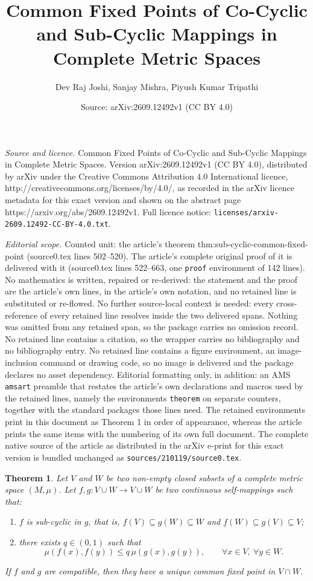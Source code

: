 \documentclass[10pt,a4paper]{amsart}
\title{Common Fixed Points of Co-Cyclic and Sub-Cyclic Mappings in Complete Metric Spaces}
\author{Dev Raj Joshi, Sanjay Mishra, Piyush Kumar Tripathi}
\date{Source: arXiv:2609.12492v1 (CC BY 4.0)}
\newtheorem{theorem}{Theorem}
\begin{document}
\maketitle

\noindent\emph{Source and licence.} Common Fixed Points of Co-Cyclic and Sub-Cyclic Mappings in Complete Metric Spaces. Version arXiv:2609.12492v1 (CC BY 4.0), distributed by arXiv under the Creative Commons Attribution 4.0 International licence, http://creativecommons.org/licenses/by/4.0/, as recorded in the arXiv licence metadata for this exact version and shown on the abstract page https://arxiv.org/abs/2609.12492v1. Full licence notice: \texttt{licenses/arxiv-2609.12492-CC-BY-4.0.txt}.\par\smallskip

\noindent\textit{Editorial scope.} Counted unit: the article's theorem thm:sub-cyclic-common-fixed-point (source0.tex lines 502--520). The article's complete original proof of it is delivered with it (source0.tex lines 522--663, one \texttt{proof} environment of 142 lines). No mathematics is written, repaired or re-derived: the statement and the proof are the article's own lines, in the article's own notation, and no retained line is substituted or re-flowed.  No further source-local context is needed: every cross-reference of every retained line resolves inside the two delivered spans.  Nothing was omitted from any retained span, so the package carries no omission record.  No retained line contains a citation, so the wrapper carries no bibliography and no bibliography entry.  No retained line contains a figure environment, an image-inclusion command or drawing code, so no image is delivered and the package declares no asset dependency.  Editorial formatting only, in addition: an AMS \texttt{amsart} preamble that restates the article's own declarations and macros used by the retained lines, namely the environments \texttt{theorem} on separate counters, together with the standard packages those lines need.  The retained environments print in this document as Theorem 1 in order of appearance, whereas the article prints the same items with the numbering of its own full document.  The complete native source of the article as distributed in the arXiv e-print for this exact version is bundled unchanged as \texttt{sources/210119/source0.tex}.
\begin{theorem}\label{thm:sub-cyclic-common-fixed-point}
Let $V$ and $W$ be two non-empty closed subsets of a complete metric
space $(M,\mu)$. Let $f,g:V\cup W\to V\cup W$ be two continuous self-mappings such that:

\begin{enumerate}
    \item[(i)] $f$ is sub-cyclic in $g$, that is, $ f(V)\subseteq g(W)\subseteq W$ and $ f(W)\subseteq g(V)\subseteq V$;
   

    \item[(ii)] there exists $q\in(0,1)$ such that
    \[
    \mu(f(x),f(y))
    \leq
    q\,\mu(g(x),g(y)),
    \qquad \forall x\in V,\ \forall y\in W.
    \]
\end{enumerate}
If $f$ and $g$ are compatible, then they have a unique common fixed
point in $V\cap W$.
\end{theorem}
\end{document}
